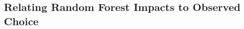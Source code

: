 \documentclass[oneside,11pt]{article}
\begin{document}








\subsection{Relating Random Forest Impacts to Observed Choice}
\end{document}
